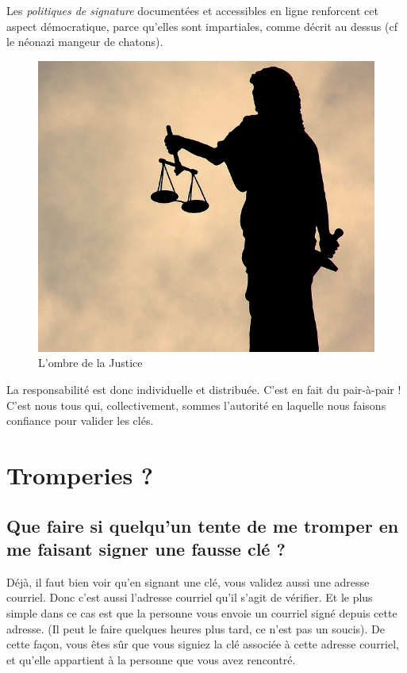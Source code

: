 Les \emph{politiques de signature} documentées et accessibles en ligne
renforcent cet aspect démocratique, parce qu'elles sont impartiales,
comme décrit au dessus (cf le néonazi mangeur de chatons).

\begin{figure}[h]
\centering
\includegraphics[width=0.7\linewidth]{./images/justice.jpg}
\caption{L'ombre de la Justice}
\end{figure}

La responsabilité est donc individuelle et distribuée. C'est en fait du
pair-à-pair ! C'est nous tous qui, collectivement, sommes l'autorité en
laquelle nous faisons confiance pour valider les clés.

\section{Tromperies ?}\label{tromperies}

\subsection{Que faire si quelqu'un tente de me tromper en me faisant
signer une fausse clé ?}\label{que-faire-si-quelquun-tente-de-me-tromper-en-me-faisant-signer-une-fausse-cluxe9}

Déjà, il faut bien voir qu'en signant une clé, vous validez aussi une
adresse courriel. Donc c'est aussi l'adresse courriel qu'il s'agit de
vérifier. Et le plus simple dans ce cas est que la personne vous envoie un
courriel signé depuis cette adresse. (Il peut le faire quelques heures
plus tard, ce n'est pas un soucis). De cette façon, vous êtes sûr que
vous signiez la clé associée à cette adresse courriel, et qu'elle
appartient à la personne que vous avez rencontré.

